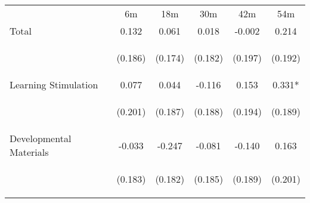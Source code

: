 \begin{tabular}{lccccc}
\hline \noalign{\smallskip} & 6m & 18m & 30m & 42m & 54m\\
\noalign{\smallskip}\hline \noalign{\smallskip}Total & 0.132 & 0.061 & 0.018 & -0.002 & 0.214\\
 & \begin{footnotesize}(0.186)\end{footnotesize} & \begin{footnotesize}(0.174)\end{footnotesize} & \begin{footnotesize}(0.182)\end{footnotesize} & \begin{footnotesize}(0.197)\end{footnotesize} & \begin{footnotesize}(0.192)\end{footnotesize}\\
\noalign{\smallskip}Learning Stimulation & 0.077 & 0.044 & -0.116 & 0.153 & 0.331*\\
 & \begin{footnotesize}(0.201)\end{footnotesize} & \begin{footnotesize}(0.187)\end{footnotesize} & \begin{footnotesize}(0.188)\end{footnotesize} & \begin{footnotesize}(0.194)\end{footnotesize} & \begin{footnotesize}(0.189)\end{footnotesize}\\
\noalign{\smallskip}Developmental Materials & -0.033 & -0.247 & -0.081 & -0.140 & 0.163\\
 & \begin{footnotesize}(0.183)\end{footnotesize} & \begin{footnotesize}(0.182)\end{footnotesize} & \begin{footnotesize}(0.185)\end{footnotesize} & \begin{footnotesize}(0.189)\end{footnotesize} & \begin{footnotesize}(0.201)\end{footnotesize}\\

\end{tabular}
